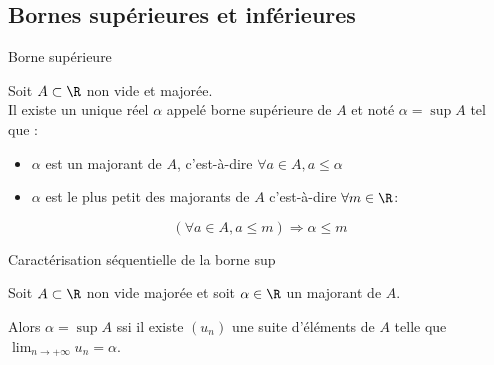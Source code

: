 \subsection{Bornes supérieures et inférieures}

\begin{theoreme}{Borne supérieure}{}

    Soit $A \subset \R$ non vide et majorée.\\

    Il existe un unique réel $\alpha$ appelé borne supérieure de $A$ et noté 
    $\alpha = \sup A$ tel que : 
    \begin{itemize}
        \item $\alpha$ est un majorant de $A$, c'est-à-dire $\forall a \in A, a \leqslant \alpha$
        \item $\alpha$ est le plus petit des majorants de $A$ c'est-à-dire $\forall m \in \R$: 
    \end{itemize}
    \[(\forall a \in A, a \leqslant m ) \Rightarrow \alpha \leqslant m\]
\end{theoreme}

\begin{theoreme}{Caractérisation séquentielle de la borne sup}{}

    Soit $A \subset \R$ non vide majorée et soit $\alpha \in \R$ un majorant de $A$.
    
    Alors $\alpha = \sup A$ ssi il existe $(u_n)$ une suite d'éléments de $A$
    telle que $\lim_{n \to + \infty} u_n = \alpha$.
\end{theoreme}


